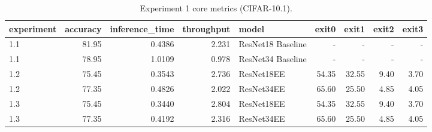 \begin{table}
\centering
\caption{Experiment 1 core metrics (CIFAR-10.1).}
\label{tab:experiment1-core-metrics-cifar10-1}
\begin{tabular}{lrrrlrrrr}
\toprule
experiment &  accuracy &  inference\_time &  throughput &             model &  exit0 &  exit1 &  exit2 &  exit3 \\
\midrule
       1.1 &     81.95 &          0.4386 &       2.231 & ResNet18 Baseline &      - &      - &      - &      - \\
       1.1 &     78.95 &          1.0109 &       0.978 & ResNet34 Baseline &      - &      - &      - &      - \\
       1.2 &     75.45 &          0.3543 &       2.736 &        ResNet18EE &  54.35 &  32.55 &   9.40 &   3.70 \\
       1.2 &     77.35 &          0.4826 &       2.022 &        ResNet34EE &  65.60 &  25.50 &   4.85 &   4.05 \\
       1.3 &     75.45 &          0.3440 &       2.804 &        ResNet18EE &  54.35 &  32.55 &   9.40 &   3.70 \\
       1.3 &     77.35 &          0.4192 &       2.316 &        ResNet34EE &  65.60 &  25.50 &   4.85 &   4.05 \\
\bottomrule
\end{tabular}
\end{table}
